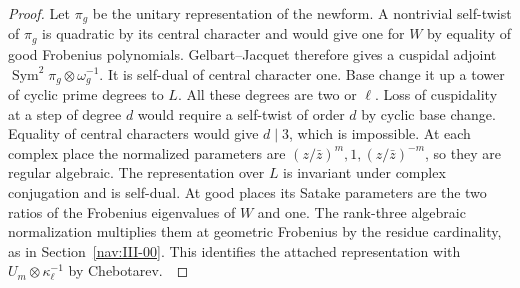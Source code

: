 \documentclass[a4paper,11pt]{article}
\theoremstyle{definition}
\theoremstyle{remark}
\numberwithin{equation}{section}
\begin{document}
\begin{proof}
Let \(\pi_g\) be the unitary representation of the newform.
A nontrivial self-twist of \(\pi_g\) is quadratic by its central
character and would give one for \(W\) by equality of good
Frobenius polynomials. Gelbart--Jacquet therefore gives a
cuspidal adjoint \(\operatorname{Sym}^2\pi_g\otimes\omega_g^{-1}\).
It is self-dual of central character one. Base change it up a
tower of cyclic prime degrees to \(L\). All these degrees are
two or \(\ell\). Loss of cuspidality at a step of degree \(d\)
would require a self-twist of order \(d\) by cyclic base change.
Equality of central characters would give \(d\mid3\), which is
impossible. At each complex place the normalized parameters
are \((z/\bar z)^m,1,(z/\bar z)^{-m}\), so they are regular
algebraic. The representation over \(L\) is invariant under
complex conjugation and is self-dual. At good places its Satake
parameters are the two ratios of the Frobenius eigenvalues of
\(W\) and one. The rank-three algebraic normalization multiplies
them at geometric Frobenius by the residue cardinality, as in
Section~\ref{nav:III-00}. This identifies the attached
representation with \(U_m\otimes\kappa_\ell^{-1}\) by
Chebotarev.~\cite{VII-V-I-gj123,VII-V-I-ac123,VII-V-V-shin}
\end{proof}
\end{document}
